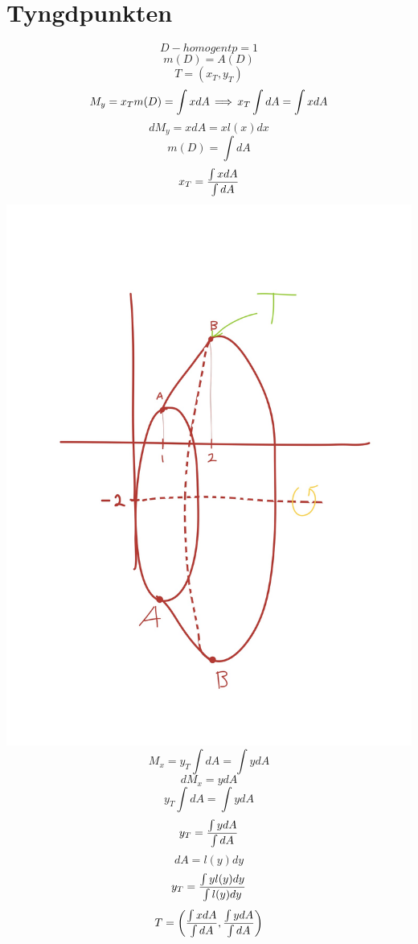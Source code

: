 \documentclass{article}
\begin{document}
\section{Tyngdpunkten}
$$ D-homogent p=1 $$
$$ m(D)=A(D) $$
$$ T=(x_T, y_T) $$
$$ M_y = x_Tm(D) = \int x dA \operatorname{\implies} x_T \int dA = \int xdA $$
$$ dM_y = xdA = xl(x)dx $$
$$ m(D) = \int dA $$
$$ x_T = \frac{\int xdA}{\int dA} $$
\includegraphics[scale=0.15]{img/img7.jpg}
$$ M_x = y_T \int dA = \int y dA $$
$$ dM_x = y dA $$
$$ y_T \int dA = \int y dA $$
$$ y_T = \frac{\int y dA}{\int dA} $$
$$ dA = l(y) dy $$
$$ y_T = \frac{\int yl(y) dy}{\int l(y) dy} $$
$$ T=\left(\frac{\int xdA}{\int dA}, \frac{\int ydA}{\int dA}\right) $$
\end{document}
